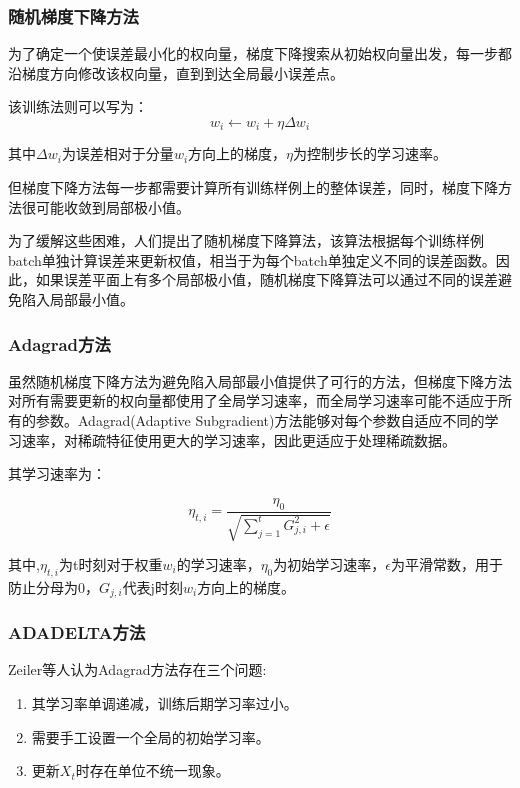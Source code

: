\subsubsection{随机梯度下降方法}
为了确定一个使误差最小化的权向量，梯度下降搜索从初始权向量出发，每一步都沿梯度方向修改该权向量，直到到达全局最小误差点。\par
该训练法则可以写为：\cite{ml2006}
\begin{equation}
w_i \leftarrow w_i + \eta\Delta w_i
\end{equation}


其中$\Delta w_i$为误差相对于分量$w_i$方向上的梯度，$\eta$为控制步长的学习速率。\par
但梯度下降方法每一步都需要计算所有训练样例上的整体误差，同时，梯度下降方法很可能收敛到局部极小值。\par
为了缓解这些困难，人们提出了随机梯度下降算法，该算法根据每个训练样例batch单独计算误差来更新权值，相当于为每个batch单独定义不同的误差函数。因此，如果误差平面上有多个局部极小值，随机梯度下降算法可以通过不同的误差避免陷入局部最小值。
\subsubsection{Adagrad方法}
虽然随机梯度下降方法为避免陷入局部最小值提供了可行的方法，但梯度下降方法对所有需要更新的权向量都使用了全局学习速率，而全局学习速率可能不适应于所有的参数。Adagrad(Adaptive Subgradient)方法\cite{adagrad}能够对每个参数自适应不同的学习速率，对稀疏特征使用更大的学习速率，因此更适应于处理稀疏数据。\par


其学习速率为：


\begin{equation}
\eta_{t, i} = \frac{\eta_0}{ \sqrt{\sum_{j=1}^{t}{G_{j,i}^2} + \epsilon}}
\end{equation}


其中,$\eta_{t, i}$为t时刻对于权重$w_i$的学习速率，$\eta_0$为初始学习速率，$\epsilon$为平滑常数，用于防止分母为0，$G_{j,i}$代表j时刻$w_i$方向上的梯度。

\subsubsection{ADADELTA方法}
Zeiler等\cite{adadelta}人认为Adagrad方法存在三个问题:


\begin{enumerate}
\item 其学习率单调递减，训练后期学习率过小。
\item 需要手工设置一个全局的初始学习率。
\item 更新$X_t$时存在单位不统一现象。
\end{enumerate}


